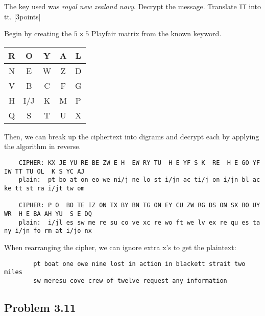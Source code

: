 \documentclass[../hw_sols.tex]{subfiles}
\begin{document}
\noindent The key used was \textit{royal new zealand navy}. Decrypt the 
message. Translate \verb|TT| into tt. [3points]

\begin{solution}

Begin by creating the $5 \times 5$ Playfair matrix from the known keyword.
	\begin{center}
	\begin{tabular}{ | c | c | c | c | c | }
		\hline \rowcolor{cyan!40}
		R & O & Y & A & L \\
		\hline \rowcolor{cyan!40}
		N & E & W & Z & D \\
		\hline
		\cellcolor{cyan!40} V & B & C & F & G \\
		\hline
		H & I/J & K & M & P \\
		\hline
		Q &   S & T & U & X \\
		\hline
	\end{tabular}
	\end{center}

\noindent Then, we can break up the ciphertext into digrams and decrypt each 
by applying the algorithm in reverse.
\begin{verbatim}
	CIPHER: KX JE YU RE BE ZW E H  EW RY TU  H E YF S K  RE  H E GO YF IW TT TU OL  K S YC AJ
	plain:  pt bo at on eo we ni/j ne lo st i/jn ac ti/j on i/jn bl ac ke tt st ra i/jt tw om

	CIPHER: P O  BO TE IZ ON TX BY BN TG ON EY CU ZW RG DS ON SX BO UY WR  H E BA AH YU  S E DQ
	plain:  i/jl es sw me re su co ve xc re wo ft we lv ex re qu es ta ny i/jn fo rm at i/jo nx
\end{verbatim}

\noindent When rearranging the cipher, we can ignore extra x's to get the 
plaintext:
\begin{verbatim}
	    pt boat one owe nine lost in action in blackett strait two miles
	    sw meresu cove crew of twelve request any information
\end{verbatim}

\end{solution}


\newpage



\subsection*{Problem 3.11}
\end{document}
